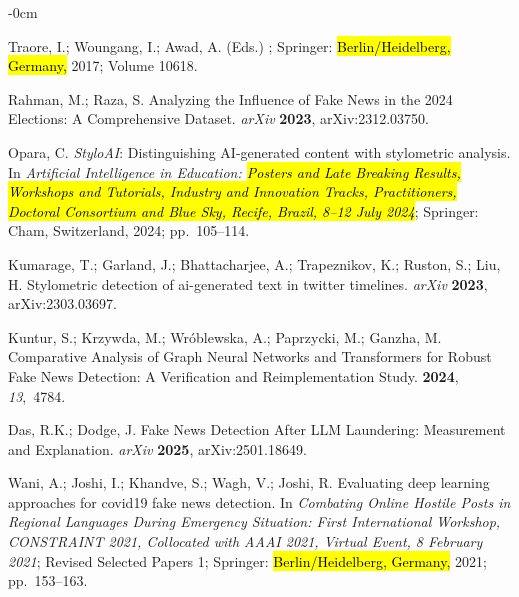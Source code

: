 \documentclass[electronics,article,accept,pdftex,moreauthors,electronics]{Definitions/mdpi}
\begin{document}
\begin{adjustwidth}{-\extralength}{0cm}
\begin{thebibliography}{999}
Traore, I.; Woungang, I.; Awad, A. (Eds.)
; Springer:  \hl{Berlin/Heidelberg, Germany,} %
 2017; Volume 10618.

Rahman, M.; Raza, S.
\newblock Analyzing the Influence of Fake News in the 2024 Elections: A
  Comprehensive Dataset.
\newblock \emph{arXiv} {\bf 2023}, arXiv:2312.03750.

Opara, C.
\newblock \emph{StyloAI}: Distinguishing AI-generated content with stylometric analysis.
\newblock In \emph{Artificial Intelligence in Education: \hl{Posters and Late Breaking Results, Workshops and Tutorials, Industry and Innovation Tracks, Practitioners, Doctoral Consortium and Blue Sky, Recife, Brazil, 8--12 July 2024}}; Springer: Cham, Switzerland, 2024; pp.~105--114.


Kumarage, T.; Garland, J.; Bhattacharjee, A.; Trapeznikov, K.; Ruston, S.; Liu, H.
\newblock Stylometric detection of ai-generated text in twitter timelines.
\newblock \emph{arXiv} \textbf{2023}, arXiv:2303.03697.

Kuntur, S.; Krzywda, M.; Wr{\'o}blewska, A.; Paprzycki, M.; Ganzha, M.
\newblock Comparative Analysis of Graph Neural Networks and Transformers for
  Robust Fake News Detection: A Verification and Reimplementation Study.
 {\bf 2024}, {\em 13},~4784.

Das, R.K.; Dodge, J.
\newblock Fake News Detection After LLM Laundering: Measurement and Explanation.
\newblock \emph{arXiv} \textbf{2025}, arXiv:2501.18649.

Wani, A.; Joshi, I.; Khandve, S.; Wagh, V.; Joshi, R.
\newblock Evaluating deep learning approaches for covid19 fake news detection.
\newblock In \emph{Combating Online Hostile Posts in Regional Languages During Emergency Situation: First International Workshop, CONSTRAINT 2021, Collocated with AAAI 2021, Virtual Event, 8 February 2021}; Revised Selected Papers 1; Springer: \hl{Berlin/Heidelberg, Germany,} %
 2021; pp.~153--163.


\end{thebibliography}
\end{adjustwidth}
\end{document}
